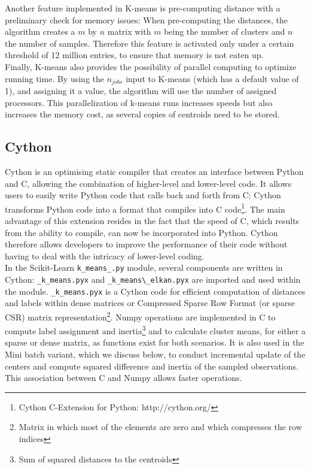 \documentclass[11pt]{article}
\begin{document}
\noindent Another feature implemented in K-means is pre-computing distance with a preliminary check for memory issues: When pre-computing the distances, the algorithm creates a $m$ by $n$ matrix with $m$ being the number of clusters and $n$ the number of samples. Therefore this feature is activated only under a certain threshold of 12 million entries, to ensure that memory is not eaten up.\\

\noindent Finally, K-means also provides the possibility of parallel computing to optimize running time. By using the $n_{jobs}$ input to K-means (which has a default value of 1), and assigning it a value, the algorithm will use the number of assigned processors. This parallelization of k-means runs increases speeds but also increases the memory cost, as several copies of centroids need to be stored. 

\subsection*{Cython}
Cython is an optimising static compiler that creates an interface between Python and C, allowing the combination of higher-level and lower-level code. It allows users to easily write Python code that calls back and forth from C: Cython transforms Python code into a format that compiles into C code\footnote{Cython C-Extension for Python: http://cython.org/}. The main advantage of this extension resides in the fact that the speed of C, which results from the ability to compile, can now be incorporated into Python. Cython therefore allows developers to improve the performance of their code without having to deal with the intricacy of lower-level coding. \\ 

\noindent In the Scikit-Learn \verb|k_means_.py| module, several components are written in Cython: \verb|_k_means.pyx| and \verb|_k_means\_elkan.pyx| are imported and used within the module. \verb|_k_means.pyx| is a Cython code for efficient computation of distances and labels within dense matrices or Compressed Sparse Row Format (or sparse CSR) matrix representation\footnote{Matrix in which most of the elements are zero and which compresses the row indices}. Numpy operations are implemented in C to compute label assignment and inertia\footnote{Sum of squared distances to the centroids} and to calculate cluster means, for either a sparse or dense matrix, as functions exist for both scenarios. It is also used in the Mini batch variant, which we discuss below, to conduct incremental update of the centers and compute squared difference and inertia of the sampled observations. This association between C and Numpy allows faster operations.\\
\end{document}
